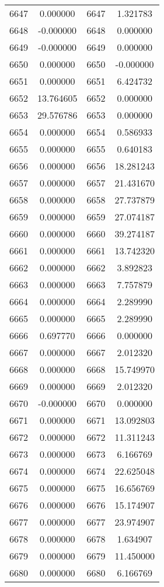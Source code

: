 \documentclass[12pt]{article}
\begin{document}
\begin{longtable}{@{}cccc@{}}
6647 & 0.000000 & 6647 & 1.321783 \\
6648 & -0.000000 & 6648 & 0.000000 \\
6649 & -0.000000 & 6649 & 0.000000 \\
6650 & 0.000000 & 6650 & -0.000000 \\
6651 & 0.000000 & 6651 & 6.424732 \\
6652 & 13.764605 & 6652 & 0.000000 \\
6653 & 29.576786 & 6653 & 0.000000 \\
6654 & 0.000000 & 6654 & 0.586933 \\
6655 & 0.000000 & 6655 & 0.640183 \\
6656 & 0.000000 & 6656 & 18.281243 \\
6657 & 0.000000 & 6657 & 21.431670 \\
6658 & 0.000000 & 6658 & 27.737879 \\
6659 & 0.000000 & 6659 & 27.074187 \\
6660 & 0.000000 & 6660 & 39.274187 \\
6661 & 0.000000 & 6661 & 13.742320 \\
6662 & 0.000000 & 6662 & 3.892823 \\
6663 & 0.000000 & 6663 & 7.757879 \\
6664 & 0.000000 & 6664 & 2.289990 \\
6665 & 0.000000 & 6665 & 2.289990 \\
6666 & 0.697770 & 6666 & 0.000000 \\
6667 & 0.000000 & 6667 & 2.012320 \\
6668 & 0.000000 & 6668 & 15.749970 \\
6669 & 0.000000 & 6669 & 2.012320 \\
6670 & -0.000000 & 6670 & 0.000000 \\
6671 & 0.000000 & 6671 & 13.092803 \\
6672 & 0.000000 & 6672 & 11.311243 \\
6673 & 0.000000 & 6673 & 6.166769 \\
6674 & 0.000000 & 6674 & 22.625048 \\
6675 & 0.000000 & 6675 & 16.656769 \\
6676 & 0.000000 & 6676 & 15.174907 \\
6677 & 0.000000 & 6677 & 23.974907 \\
6678 & 0.000000 & 6678 & 1.634907 \\
6679 & 0.000000 & 6679 & 11.450000 \\
6680 & 0.000000 & 6680 & 6.166769 \\

\end{longtable}
\end{document}
